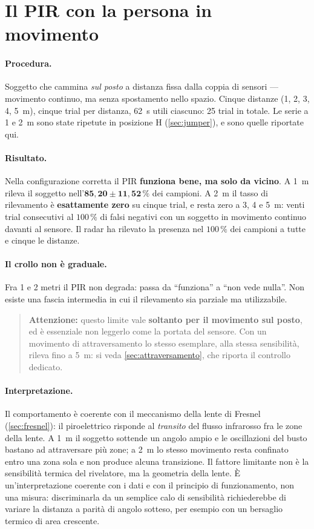 \section{Il PIR con la persona in movimento}
\label{sec:pir-movimento}

\paragraph{Procedura.} Soggetto che cammina \emph{sul posto} a distanza fissa dalla
coppia di sensori --- movimento continuo, ma senza spostamento nello spazio. Cinque
distanze (1, 2, 3, 4, 5~m), cinque trial per distanza, 62~s utili ciascuno: 25 trial
in totale. Le serie a 1 e 2~m sono state ripetute in posizione H
(\cref{sec:jumper}), e sono quelle riportate qui.

\paragraph{Risultato.} Nella configurazione corretta il PIR \textbf{funziona bene, ma
solo da vicino}. A 1~m rileva il soggetto nell'$\mathbf{85{,}20 \pm 11{,}52\,\%}$ dei
campioni. A 2~m il tasso di rilevamento è \textbf{esattamente zero} su cinque trial, e
resta zero a 3, 4 e 5~m: venti trial consecutivi al $100\,\%$ di falsi negativi con un
soggetto in movimento continuo davanti al sensore. Il radar ha rilevato la presenza
nel $100\,\%$ dei campioni a tutte e cinque le distanze.

\paragraph{Il crollo non è graduale.} Fra 1 e 2 metri il PIR non degrada: passa da
``funziona'' a ``non vede nulla''. Non esiste una fascia intermedia in cui il
rilevamento sia parziale ma utilizzabile.

\begin{quote}
\small
\textbf{Attenzione:} questo limite vale \textbf{soltanto per il movimento sul posto}, ed è essenziale
non leggerlo come la portata del sensore. Con un movimento di attraversamento lo
stesso esemplare, alla stessa sensibilità, rileva fino a 5~m: si veda
\cref{sec:attraversamento}, che riporta il controllo dedicato.
\end{quote}

\paragraph{Interpretazione.} Il comportamento è coerente con il meccanismo della lente
di Fresnel (\cref{sec:fresnel}): il piroelettrico risponde al \emph{transito} del
flusso infrarosso fra le zone della lente. A 1~m il soggetto sottende un angolo ampio
e le oscillazioni del busto bastano ad attraversare più zone; a 2~m lo stesso
movimento resta confinato entro una zona sola e non produce alcuna transizione. Il
fattore limitante non è la sensibilità termica del rivelatore, ma la geometria della
lente. È un'interpretazione coerente con i dati e con il principio di funzionamento,
non una misura: discriminarla da un semplice calo di sensibilità richiederebbe di
variare la distanza a parità di angolo sotteso, per esempio con un bersaglio termico
di area crescente.

